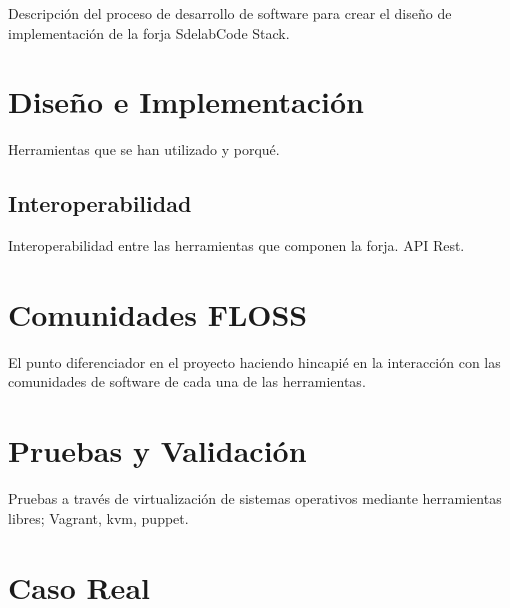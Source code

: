 \documentclass[11pt]{scrartcl}
\begin{document}
\par Descripci\'on del proceso de desarrollo de software para crear el diseño de implementaci\'on de la forja SdelabCode Stack.



\section{Dise\~no e Implementaci\'on}
\label{sec:diseno}

\par Herramientas que se han utilizado y porqu\'e.


\subsection{Interoperabilidad}
\label{sub:interoperabilidad}

\par Interoperabilidad entre las herramientas que componen la forja. API Rest.


\section{Comunidades FLOSS}
\label{sec:comunidades}

\par El punto diferenciador en el proyecto haciendo hincapi\'e en la interacci\'on con las comunidades de software de cada una de las herramientas.


\section{Pruebas y Validaci\'on}
\label{sec:pruebas}

\par Pruebas a través de virtualizaci\'on de sistemas operativos mediante herramientas libres; Vagrant, kvm, puppet.


\section{Caso Real}
\label{sec:casoreal}
\end{document}
